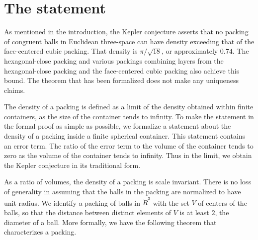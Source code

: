 \section{The statement}\label{sec:statement}

As mentioned in the introduction, the Kepler conjecture asserts that
no packing of congruent balls in Euclidean three-space can have
density exceeding that of the face-centered cubic packing.  That
density is $\pi/\sqrt{18}$, or approximately $0.74$.  The
hexagonal-close packing and various packings combining layers from the
hexagonal-close packing and the face-centered cubic packing also
achieve this bound.  The theorem that has been formalized does not
make any uniqueness claims.

The density of a packing is defined as a limit of the density obtained
within finite containers, as the size of the container tends to
infinity.  To make the statement in the formal proof as simple as
possible, we formalize a statement about the density of a packing
inside a finite spherical container.  This statement contains an error
term.  The ratio of the error term to the volume of the container
tends to zero as the volume of the container tends to infinity.  Thus
in the limit, we obtain the Kepler conjecture in its traditional form.

As a ratio of volumes, the density of a packing is scale invariant.
There is no loss of generality in assuming that the balls in the
packing are normalized to have unit radius.  We identify a packing of
balls in $\ring{R}^3$ with the set $V$ of centers of the balls, so
that the distance between distinct elements of $V$ is at least $2$,
the diameter of a ball.  More formally, we have the following
theorem that characterizes a packing.


